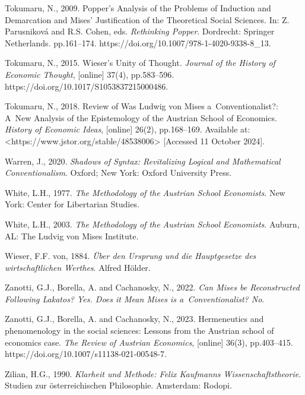 Tokumaru, N., 2009. Popper's Analysis of the Problems of Induction and Demarcation and Mises' Justification of the Theoretical Social Sciences. In: Z. Parusniková and R.S. Cohen, eds. \textit{Rethinking Popper}. Dordrecht: Springer Netherlands. pp.161–174. https://doi.org/10.1007/978-1-4020-9338-8\_13.



Tokumaru, N., 2015. Wieser's Unity of Thought. \textit{Journal of the History of Economic Thought}, [online] 37(4), pp.583–596. https://doi.org/10.1017/S1053837215000486.



Tokumaru, N., 2018. Review of Was Ludwig von Mises a~Conventionalist?: A~New Analysis of the Epistemology of the Austrian School of Economics. \textit{History of Economic Ideas}, [online] 26(2), pp.168–169. Available at: {\textless}https://www.jstor.org/stable/48538006{\textgreater} [Accessed 11 October 2024].



Warren, J., 2020. \textit{Shadows of Syntax: Revitalizing Logical and Mathematical Conventionalism}. Oxford; New York: Oxford University Press.



White, L.H., 1977. \textit{The Methodology of the Austrian School Economists}. New York: Center for Libertarian Studies.



White, L.H., 2003. \textit{The Methodology of the Austrian School Economists}. Auburn, AL: The Ludvig von Mises Institute.



Wieser, F.F. von, 1884. \textit{Über den Ursprung und die Hauptgesetze des wirtschaftlichen Werthes}. Alfred Hölder.



Zanotti, G.J., Borella, A. and Cachanosky, N., 2022. \textit{Can Mises be Reconstructed Following Lakatos? Yes. Does it Mean Mises is a~Conventionalist? No}.



Zanotti, G.J., Borella, A. and Cachanosky, N., 2023. Hermeneutics and phenomenology in the social sciences: Lessons from the Austrian school of economics case. \textit{The Review of Austrian Economics}, [online] 36(3), pp.403–415. https://doi.org/10.1007/s11138-021-00548-7.



Zilian, H.G., 1990. \textit{Klarheit und Methode: Felix Kaufmanns Wissenschaftstheorie}. Studien zur österreichischen Philosophie. Amsterdam: Rodopi.



